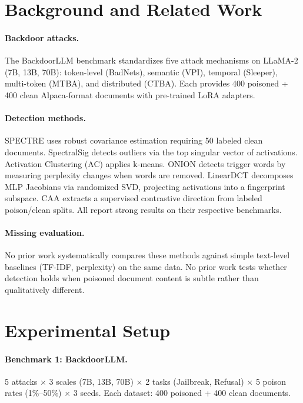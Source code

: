 \documentclass{article}
\begin{document}
\section{Background and Related Work}

\paragraph{Backdoor attacks.} The BackdoorLLM benchmark standardizes five attack mechanisms on LLaMA-2 (7B, 13B, 70B): token-level (BadNets), semantic (VPI), temporal (Sleeper), multi-token (MTBA), and distributed (CTBA). Each provides 400 poisoned + 400 clean Alpaca-format documents with pre-trained LoRA adapters.

\paragraph{Detection methods.} SPECTRE uses robust covariance estimation requiring 50 labeled clean documents. SpectralSig detects outliers via the top singular vector of activations. Activation Clustering (AC) applies k-means. ONION detects trigger words by measuring perplexity changes when words are removed. LinearDCT decomposes MLP Jacobians via randomized SVD, projecting activations into a fingerprint subspace. CAA extracts a supervised contrastive direction from labeled poison/clean splits. All report strong results on their respective benchmarks.

\paragraph{Missing evaluation.} No prior work systematically compares these methods against simple text-level baselines (TF-IDF, perplexity) on the same data. No prior work tests whether detection holds when poisoned document content is subtle rather than qualitatively different.

\section{Experimental Setup}

\paragraph{Benchmark 1: BackdoorLLM.} 5 attacks $\times$ 3 scales (7B, 13B, 70B) $\times$ 2 tasks (Jailbreak, Refusal) $\times$ 5 poison rates (1\%--50\%) $\times$ 3 seeds. Each dataset: 400 poisoned + 400 clean documents.
\end{document}
